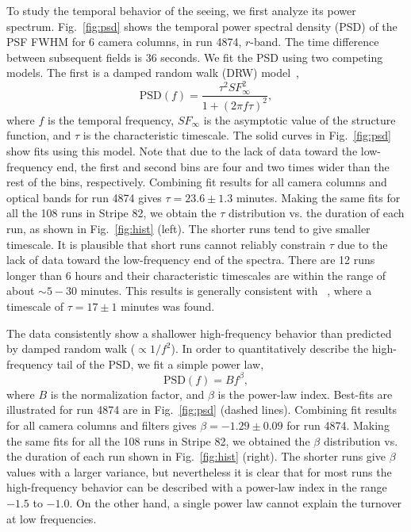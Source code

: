 To study the temporal behavior of the seeing, we first analyze its power spectrum.
Fig.~\ref{fig:psd} shows the temporal power spectral density (PSD) of the
PSF FWHM for 6 camera columns, in run 4874, $r$-band.
The time difference between subsequent fields is 36 seconds.
We fit the PSD using two competing models.
The first is a damped random walk (DRW) model~\citep[for introduction see Chapter 10 in][]{zeljkoBook},
\begin{equation}
\textrm{PSD}(f) = \frac{\tau^2 SF^2_{\infty}}{1+(2\pi f \tau)^2},
\end{equation}
where $f$ is the temporal frequency, $SF_{\infty}$ is the asymptotic
value of the structure function, and $\tau$ is the
characteristic timescale.
The solid curves in Fig.~\ref{fig:psd} show fits using this model.
Note that due to the lack of data toward the low-frequency end, the
first and second bins are four and two times wider than the
rest of the bins, respectively.
Combining fit results for all camera columns and optical bands for run 4874
gives $\tau = 23.6 \pm 1.3$ minutes.
Making the same fits for all the 108 runs in Stripe 82, 
we obtain the $\tau$ distribution vs. the duration of each
run, as shown in Fig.~\ref{fig:hist} (left).
The shorter runs tend to give smaller timescale. It is plausible that short runs 
cannot reliably constrain $\tau$ due to the lack of data toward the low-frequency 
end of the spectra. There are 12 runs longer than 6 hours and their characteristic timescales
are within the range of about $\sim5-30$ minutes.
This results is generally consistent with ~\cite{Racine1996}, where a timescale of 
$\tau = 17 \pm 1$ minutes was found.

The data consistently show a shallower high-frequency behavior than predicted
by damped random walk ($\propto 1/f^2$). In order to quantitatively describe 
the high-frequency tail of the PSD, we fit a simple power law,
\begin{equation}
\textrm{PSD}(f) = B f^\beta,
\end{equation}
where $B$ is the normalization factor, and $\beta$ is the power-law index.
Best-fits are illustrated for run 4874 are in Fig.~\ref{fig:psd} (dashed lines).
Combining fit results for all camera columns and filters gives $\beta = -1.29\pm 0.09$ 
for run 4874. Making the same fits for all the 108 runs in Stripe 82, we obtained the 
$\beta$ distribution vs. the duration of each run shown in Fig.~\ref{fig:hist} (right).
The shorter runs give $\beta$ values with a larger variance, but nevertheless it is 
clear that for most runs the high-frequency behavior can be described with a 
power-law index in the range $-1.5$ to $-1.0$. On the other hand, a single 
power law cannot explain the turnover at low frequencies. 

